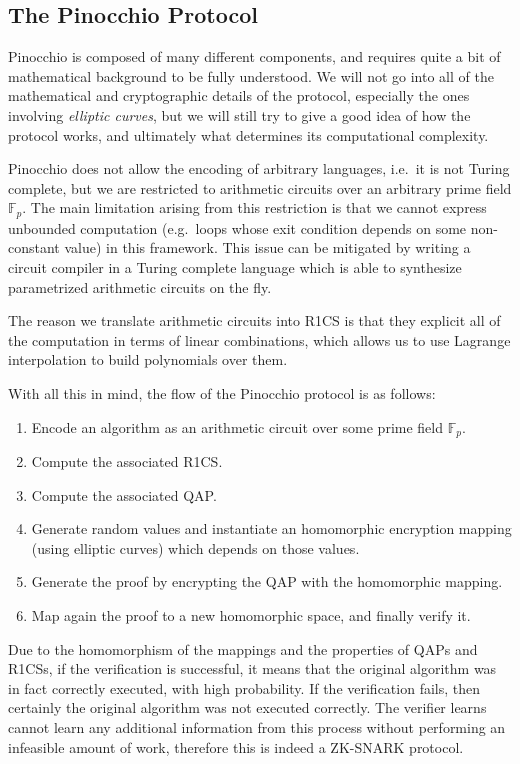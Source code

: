 
\subsection{The Pinocchio Protocol}
Pinocchio is composed of many different components, and requires quite a bit of mathematical
background to be fully understood. We will not go into all of the mathematical and cryptographic
details of the protocol, especially the ones involving \emph{elliptic curves},
but we will still try to give a good idea of how the protocol works, and ultimately what
determines its computational complexity.

Pinocchio does not allow the encoding of arbitrary languages, i.e.\ it is not Turing complete, but
we are restricted to arithmetic circuits over an arbitrary prime field \(\mathbb{F}_p\).
The main limitation arising from this restriction is that we cannot express unbounded computation
(e.g.\ loops whose exit condition depends on some non-constant value) in this framework.
This issue can be mitigated by writing a circuit compiler in a Turing complete language which
is able to synthesize parametrized arithmetic circuits on the fly.

\noindent The reason we translate arithmetic circuits into R1CS is that they explicit all of the
computation in terms of linear combinations, which allows us to use Lagrange interpolation to
build polynomials over them.

\noindent
With all this in mind, the flow of the Pinocchio protocol is as follows:
\begin{enumerate}
	\item Encode an algorithm as an arithmetic circuit over some prime field \(\mathbb{F}_p\).
	\item Compute the associated R1CS\@.
	\item Compute the associated QAP\@.
	\item Generate random values and instantiate an homomorphic encryption mapping
	      (using elliptic curves) which depends on those values.
	\item Generate the proof by encrypting the QAP with the homomorphic mapping.
	\item Map again the proof to a new homomorphic space, and finally verify it.
\end{enumerate}

\noindent Due to the homomorphism of the mappings and the properties of QAPs and R1CSs, if the
verification is successful, it means that the original algorithm was in fact correctly executed,
with high probability.
If the verification fails, then certainly the original algorithm was not executed correctly.
The verifier learns cannot learn any additional information from this process without performing
an infeasible amount of work, therefore this is indeed a ZK-SNARK protocol.
